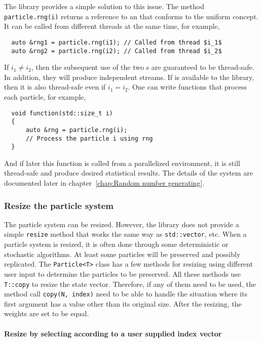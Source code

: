 The library provides a simple solution to this issue. The method
\verb|particle.rng(i)| returns a reference to an \rng that conforms to the
\cppoo uniform \rng concept. It can be called from different threads at the
same time, for example,
\begin{Verbatim}
  auto &rng1 = particle.rng(i1); // Called from thread $i_1$
  auto &rng2 = particle.rng(i2); // Called from thread $i_2$
\end{Verbatim}
If $i_1 \ne i_2$, then the subsequent use of the two \rng{}s are guaranteed to
be thread-safe. In addition, they will produce independent streams. If \tbb is
available to the library, then it is also thread-safe even if $i_1 = i_2$. One
can write functions that process each particle, for example,
\begin{Verbatim}
  void function(std::size_t i)
  {
      auto &rng = particle.rng(i);
      // Process the particle i using rng
  }
\end{Verbatim}
And if later this function is called from a parallelized environment, it is
still thread-safe and produce desired statistical results. The details of the
\rng system are documented later in chapter~\ref{chap:Random number
  generating}.

\subsubsection{Resize the particle system}

The particle system can be resized. However, the library does not provide a
simple \verb|resize| method that works the same way as \verb|std::vector|, etc.
When a particle system is resized, it is often done through some deterministic
or stochastic algorithms. At least some particles will be preserved and
possibly replicated. The \verb|Particle<T>| class has a few methods for
resizing using different user input to determine the particles to be preserved.
All these methods use \verb|T::copy| to resize the state vector. Therefore, if
any of them need to be used, the method call \verb|copy(N, index)| need to be
able to handle the situation where its first argument has a value other than
its original size. After the resizing, the weights are set to be equal.

\paragraph{Resize by selecting according to a user supplied index vector}

